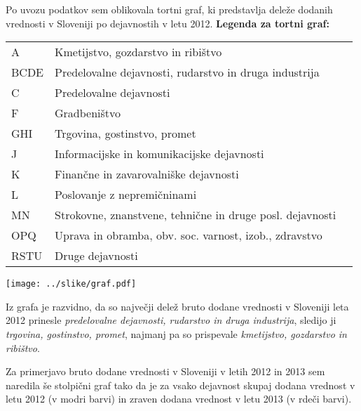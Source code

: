 \documentclass[a4paper, 11pt]{article}
\begin{document}
Po uvozu podatkov sem oblikovala tortni graf, ki predstavlja deleže dodanih vrednosti v Sloveniji po dejavnostih v letu 2012.
\newpage
\textbf{Legenda za tortni graf:}
\begin{table}[h]
\begin{tabular}{lll}
A & Kmetijstvo, gozdarstvo in ribištvo \\
BCDE & Predelovalne dejavnosti, rudarstvo in druga industrija \\
C & Predelovalne dejavnosti \\
F & Gradbeništvo \\
GHI & Trgovina, gostinstvo, promet \\
J & Informacijske in komunikacijske dejavnosti\\
K & Finančne in zavarovalniške dejavnosti\\
L & Poslovanje z nepremičninami \\
MN & Strokovne, znanstvene, tehnične in druge posl. dejavnosti \\
OPQ & Uprava in obramba, obv. soc. varnost, izob., zdravstvo \\
RSTU & Druge dejavnosti
\end{tabular}
\end{table}

\begin{center}
\texttt{[image: ../slike/graf.pdf]}
\end{center}


Iz grafa je razvidno, da so največji dele\-ž bruto dodane vrednosti v Sloveniji leta 2012 prinesle \textit{predelovalne dejavnosti, rudarstvo in
druga industrija}, sledijo ji \textit{trgovina, gostinstvo, promet}, najmanj pa so prispevale \textit{kmetijstvo, gozdarstvo in ribi\-štvo}. 

Za primerjavo bruto dodane vrednosti v Sloveniji v letih 2012 in 2013 sem naredila še stolpični graf tako da je za vsako dejavnost skupaj dodana vrednost v letu 2012 (v  modri barvi) in zraven dodana vrednost v letu 2013 (v rdeči barvi).
\end{document}
